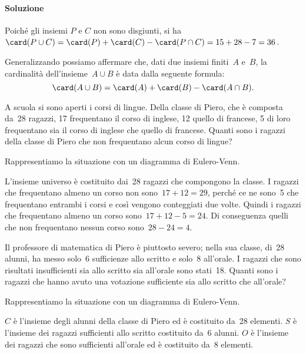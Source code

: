 \begin{exrig}
\begin{esempio}
\paragraph{Soluzione} Poiché gli insiemi $P$ e $C$ non sono disgiunti, si ha $\card(P\cup C)=\card(P)+\card(C)-\card(P\cap C)=15+28-7=36$.

Generalizzando possiamo affermare che, dati due insiemi finiti~$A$ e~$B$, la cardinalità dell'insieme~$A\cup B$ è data dalla seguente formula:
\[\card(A\cup B)=\card(A)+\card(B)-\card(A\cap B).\]
\end{esempio}

\begin{esempio}
 A scuola si sono aperti i corsi di lingue. Della classe di Piero, che è composta da~28 ragazzi, 17 frequentano il corso di inglese, 12
quello di francese, 5 di loro frequentano sia il corso di inglese che quello di francese. Quanti sono i ragazzi della classe di Piero che non
frequentano alcun corso di lingue?

Rappresentiamo la situazione con un diagramma di Eulero-Venn.
\begin{multicols}{2}
L'insieme universo è costituito dai~28 ragazzi che
compongono la classe. I ragazzi che frequentano almeno un corso non sono~$17+12=29$, perché ce ne sono~5 che frequentano entrambi i corsi e così
vengono conteggiati due volte. Quindi i ragazzi che frequentano almeno un corso sono~$17+12-5=24$. Di conseguenza quelli che non frequentano
nessun corso sono~$28-24=4$.
\begin{center}
 
\end{center}
\end{multicols}
\end{esempio}

\begin{esempio}
 Il professore di matematica di Piero è piuttosto severo; nella sua classe, di~28 alunni, ha messo solo~6 sufficienze allo scritto e solo~8
all'orale. I ragazzi che sono risultati insufficienti sia allo scritto sia all'orale sono stati~18. Quanti
sono i ragazzi che hanno avuto una votazione sufficiente sia allo scritto che all'orale?

Rappresentiamo la situazione con un diagramma di Eulero-Venn.
\begin{multicols}{2}
$C$ è l'insieme degli alunni della classe di Piero ed è costituito da~28 elementi. $S$ è l'insieme dei ragazzi
sufficienti allo scritto costituito da~6 alunni. $O$ è l'insieme dei ragazzi che sono sufficienti
all'orale ed è costituito da~8 elementi.


\end{multicols}
\end{esempio}
\end{exrig}
